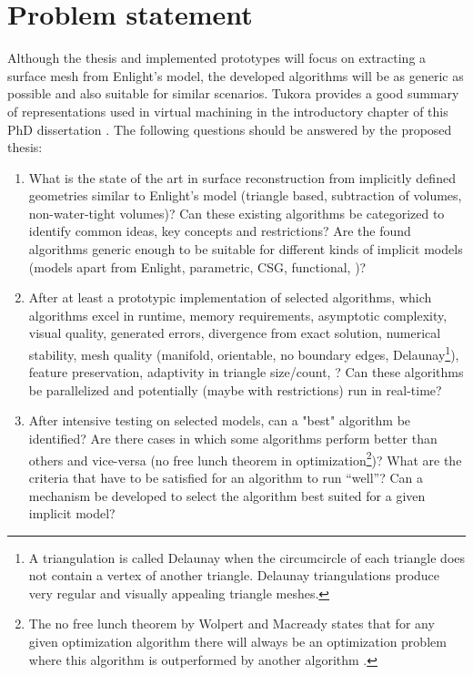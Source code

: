 
\section{Problem statement}

Although the thesis and implemented prototypes will focus on extracting a surface mesh from Enlight's model, the developed algorithms will be as generic as possible and also suitable for similar scenarios. Tukora provides a good summary of representations used in virtual machining in the introductory chapter of this PhD dissertation \cite{virtual_machining_review}.
The following questions should be answered by the proposed thesis:

\begin{enumerate}
	\item What is the state of the art in surface reconstruction from implicitly defined geometries similar to Enlight's model (triangle based, subtraction of volumes, non-water-tight volumes)? Can these existing algorithms be categorized to identify common ideas, key concepts and restrictions? Are the found algorithms generic enough to be suitable for different kinds of implicit models (models apart from Enlight, parametric, CSG, functional, \etc)?
	
	\item After at least a prototypic implementation of selected algorithms, which algorithms excel in runtime, memory requirements, asymptotic complexity, visual quality, generated errors, divergence from exact solution, numerical stability, mesh quality (manifold, orientable, no boundary edges, Delaunay\footnote{A triangulation is called Delaunay when the circumcircle of each triangle does not contain a vertex of another triangle. Delaunay triangulations produce very regular and visually appealing triangle meshes.}), feature preservation, adaptivity in triangle size/count, \etc? Can these algorithms be parallelized and potentially (maybe with restrictions) run in real-time?
	
	\item After intensive testing on selected models, can a "best" algorithm be identified? Are there cases in which some algorithms perform better than others and vice-versa (\cf no free lunch theorem in optimization\footnote{The no free lunch theorem by Wolpert and Macready states that for any given optimization algorithm there will always be an optimization problem where this algorithm is outperformed by another algorithm \cite{no_free_lunch}. })? What are the criteria that have to be satisfied for an algorithm to run \enquote{well}? Can a mechanism be developed to select the algorithm best suited for a given implicit model?
\end{enumerate}

